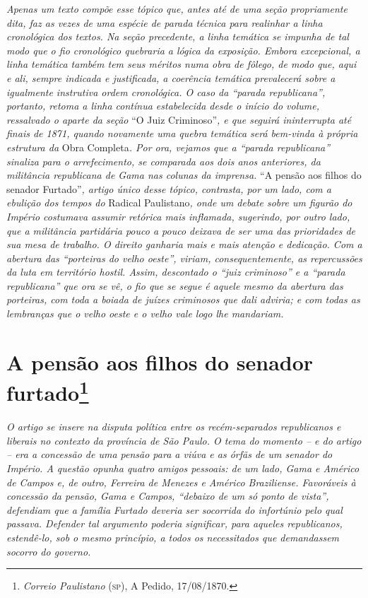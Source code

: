 \begin{argumento}
\emph{Apenas um texto compõe esse tópico que, antes até de uma seção
propriamente dita, faz as vezes de uma espécie de parada técnica para
realinhar a linha cronológica dos textos. Na seção precedente, a linha
temática se impunha de tal modo que o fio cronológico quebraria a lógica
da exposição. Embora excepcional, a linha temática também tem seus
méritos numa obra de fôlego, de modo que, aqui e ali, sempre indicada e
justificada, a coerência temática prevalecerá sobre a igualmente
instrutiva ordem cronológica. O caso da ``parada republicana'', portanto,
retoma a linha contínua estabelecida desde o início do volume,
ressalvado o aparte da seção} ``O Juiz Criminoso''\emph{, e que seguirá
ininterrupta até finais de 1871, quando novamente uma quebra temática
será bem-vinda à própria estrutura da} Obra Completa\emph{. Por ora,
vejamos que a ``parada republicana'' sinaliza para o arrefecimento, se
comparada aos dois anos anteriores, da militância republicana de Gama
nas colunas da imprensa.} ``A pensão aos filhos do senador
Furtado''\emph{, artigo único desse tópico, contrasta, por um lado, com a
ebulição dos tempos do} Radical Paulistano\emph{, onde um debate sobre
um figurão do Império costumava assumir retórica mais inflamada,
sugerindo, por outro lado, que a militância partidária pouco a pouco
deixava de ser uma das prioridades de sua mesa de trabalho. O direito
ganharia mais e mais atenção e dedicação. Com a abertura das ``porteiras
do velho oeste'', viriam, consequentemente, as repercussões da luta em
território hostil. Assim, descontado o ``juiz criminoso'' e a ``parada
republicana'' que ora se vê, o fio que se segue é aquele mesmo da
abertura das porteiras, com toda a boiada de juízes criminosos que dali
adviria; e com todas as lembranças que o velho oeste e o velho vale logo
lhe mandariam.}
\end{argumento}

\chapter{A pensão aos filhos do senador furtado\footnote{\emph{Correio Paulistano} (\textsc{sp}), A Pedido, 17/08/1870.}}%

\begin{didascalia}
\emph{O artigo se insere na disputa política entre os recém-separados
republicanos e liberais no contexto da província de São Paulo. O tema do
momento -- e do artigo -- era a concessão de uma pensão para a viúva e
as órfãs de um senador do Império. A questão opunha quatro amigos
pessoais: de um lado, Gama e Américo de Campos e, de outro, Ferreira de
Menezes e Américo Braziliense. Favoráveis à concessão da pensão, Gama e
Campos, ``debaixo de um só ponto de vista'', defendiam que a família
Furtado deveria ser socorrida do infortúnio pelo qual passava. Defender
tal argumento poderia significar, para aqueles republicanos, estendê-lo,
sob o mesmo princípio, a todos os necessitados que demandassem socorro
do governo.}
\end{didascalia}


